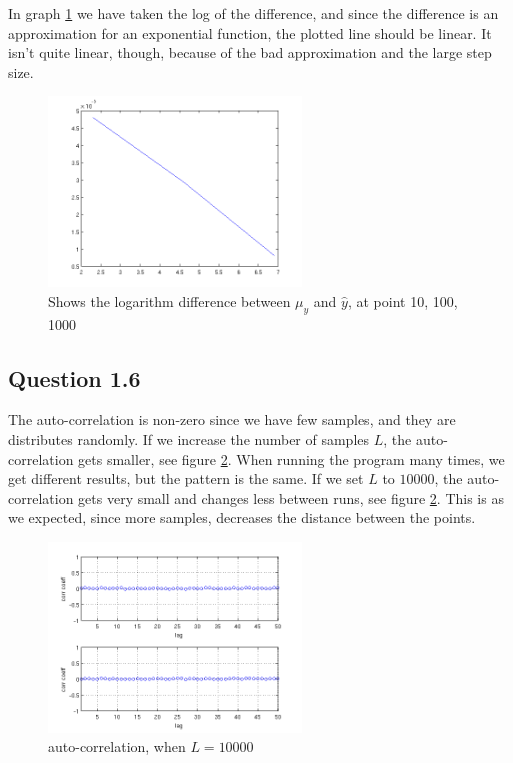 \documentclass[a4paper, 10pt, final]{article}
\begin{document}
In graph \ref{fig:q5_log} we have taken the log of the difference, and
since the difference is an approximation for an exponential function, the
plotted line should be linear. It isn't quite linear, though, because of the bad
approximation and the large step size.

\begin{figure}[!ht]
  \centering
  \includegraphics[width=0.6\textwidth]{images/q5_L10_L100_L1000_log}
  \caption{Shows the logarithm difference between $\mu _y$ and $\hat{y}$, at point 10, 100, 1000}
  \label{fig:q5_log}
\end{figure}

\subsection*{Question 1.6}

The auto-correlation is non-zero since we have few samples, and they
are distributes randomly. If we increase the number of samples $L$, the
auto-correlation gets smaller, see figure \ref{L10000}. When running the
program many times, we get different results, but the pattern is the same.
If we set $L$ to $10000$, the auto-correlation gets very small and changes
less between runs, see figure \ref{L10000}. This is as we expected, since
more samples, decreases the distance between the points.

\begin{figure}[!htpb]
  \centering
  \includegraphics[width=0.6\textwidth]{images/L10000}
  \caption{auto-correlation, when $L = 10000$}
  \label{L10000}
\end{figure}
\newpage
\newpage
\newpage
\newpage
\newpage
\end{document}
